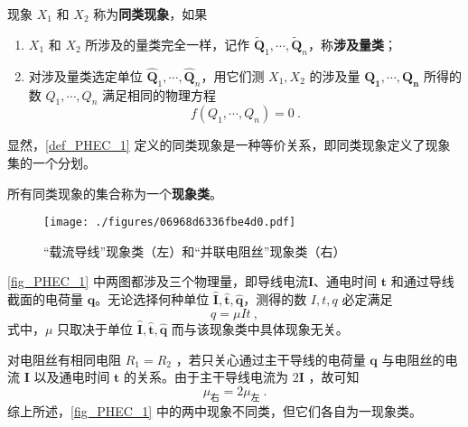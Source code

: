 \begin{definition}{}\label{def_PHEC_1}
现象 $X_1$ 和 $X_2$ 称为\textbf{同类现象}，如果
\begin{enumerate}
\item $X_1$ 和 $X_2$ 所涉及的量类完全一样，记作 $\tilde{\boldsymbol{Q}}_1,\cdots,\tilde{\boldsymbol{Q}}_n$，称\textbf{涉及量类}； 
\item 对涉及量类选定单位 $\hat{\boldsymbol{Q}}_1,\cdots,\hat{\boldsymbol{Q}}_n$，用它们测 $X_1,X_2$ 的涉及量 $\boldsymbol{Q_1},\cdots ,\boldsymbol{Q_n}$ 所得的数 $Q_1,\cdots,Q_n$ 满足相同的物理方程
\begin{equation}
f(Q_1,\cdots,Q_n)=0~.
\end{equation}
\end{enumerate}
\end{definition}
显然，\autoref{def_PHEC_1} 定义的同类现象是一种等价关系，即同类现象定义了现象集的一个分划。
\begin{definition}{}
所有同类现象的集合称为一个\textbf{现象类}。
\end{definition}
\begin{example}{}
\begin{figure}[ht]
\centering
\texttt{[image: ./figures/06968d6336fbe4d0.pdf]}
\caption{“载流导线”现象类（左）和“并联电阻丝”现象类（右）} \label{fig_PHEC_1}
\end{figure}
\autoref{fig_PHEC_1} 中两图都涉及三个物理量，即导线电流$\boldsymbol{I}$、通电时间 $\boldsymbol{t}$ 和通过导线截面的电荷量 $\boldsymbol{q}$。无论选择何种单位 $\hat{\boldsymbol{I}},\hat{\boldsymbol{t}},\hat{\boldsymbol{q}}$，测得的数 $I,t,q$ 必定满足
\begin{equation}
q=\mu It~,
\end{equation}
式中，$\mu$ 只取决于单位 $\hat{\boldsymbol{I}},\hat{\boldsymbol{t}},\hat{\boldsymbol{q}}$ 而与该现象类中具体现象无关。

对电阻丝有相同电阻 $R_1=R_2$ ，若只关心通过主干导线的电荷量 $\boldsymbol{q}$ 与电阻丝的电流 $\boldsymbol{I}$ 以及通电时间 $\boldsymbol{t}$ 的关系。由于主干导线电流为 $2\boldsymbol{I}$ ，故可知 
\begin{equation}
\mu_{\text{右}}=2\mu_{\text{左}}~.
\end{equation}
综上所述，\autoref{fig_PHEC_1} 中的两中现象不同类，但它们各自为一现象类。

\end{example}
